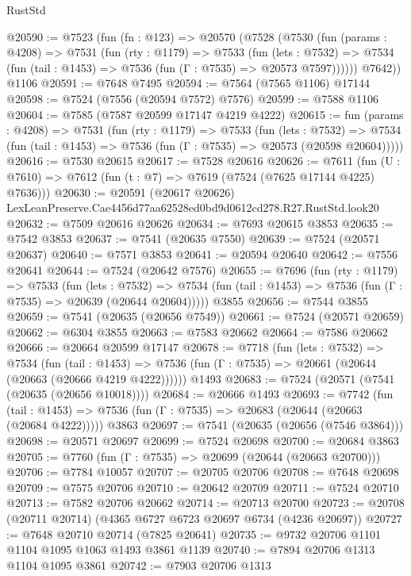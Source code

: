 \begin{lexlean}{RustStd}
\begin{coremodule}
@20590 := @7523
    (fun (fn : @123) =>
    @20570
      (@7528
        (@7530
          (fun (params : @4208) =>
          @7531
            (fun (rty : @1179) =>
            @7533
              (fun (lets : @7532) =>
              @7534 (fun (tail : @1453) => @7536 (fun (Γ : @7535) => @20573 @7597))))))
        @7642))
    @1106
@20591 := @7648 @7495
@20594 := @7564 (@7565 @1106) @17144
@20598 := @7524 (@7556 (@20594 @7572) @7576)
@20599 := @7588 @1106
@20604 := @7585 (@7587 @20599 @17147 @4219 @4222)
@20615 := fun (params : @4208) =>
  @7531
    (fun (rty : @1179) =>
    @7533
      (fun (lets : @7532) =>
      @7534 (fun (tail : @1453) => @7536 (fun (Γ : @7535) => @20573 (@20598 @20604)))))
@20616 := @7530 @20615
@20617 := @7528 @20616
@20626 := @7611
    (fun (U : @7610) => @7612 (fun (t : @7) => @7619 (@7524 (@7625 @17144 @4225) @7636)))
@20630 := @20591
    (@20617 @20626)
    LexLeanPreserve.Cae4456d77aa62528ed0bd9d0612cd278.R27.RustStd.look20
@20632 := @7509 @20616 @20626
@20634 := @7693 @20615 @3853
@20635 := @7542 @3853
@20637 := @7541 (@20635 @7550)
@20639 := @7524 (@20571 @20637)
@20640 := @7571 @3853
@20641 := @20594 @20640
@20642 := @7556 @20641
@20644 := @7524 (@20642 @7576)
@20655 := @7696
    (fun (rty : @1179) =>
    @7533
      (fun (lets : @7532) =>
      @7534 (fun (tail : @1453) => @7536 (fun (Γ : @7535) => @20639 (@20644 @20604)))))
    @3855
@20656 := @7544 @3855
@20659 := @7541 (@20635 (@20656 @7549))
@20661 := @7524 (@20571 @20659)
@20662 := @6304 @3855
@20663 := @7583 @20662
@20664 := @7586 @20662
@20666 := @20664 @20599 @17147
@20678 := @7718
    (fun (lets : @7532) =>
    @7534
      (fun (tail : @1453) =>
      @7536 (fun (Γ : @7535) => @20661 (@20644 (@20663 (@20666 @4219 @4222))))))
    @1493
@20683 := @7524 (@20571 (@7541 (@20635 (@20656 @10018))))
@20684 := @20666 @1493
@20693 := @7742
    (fun (tail : @1453) => @7536 (fun (Γ : @7535) => @20683 (@20644 (@20663 (@20684 @4222)))))
    @3863
@20697 := @7541 (@20635 (@20656 (@7546 @3864)))
@20698 := @20571 @20697
@20699 := @7524 @20698
@20700 := @20684 @3863
@20705 := @7760 (fun (Γ : @7535) => @20699 (@20644 (@20663 @20700)))
@20706 := @7784 @10057
@20707 := @20705 @20706
@20708 := @7648 @20698
@20709 := @7575 @20706
@20710 := @20642 @20709
@20711 := @7524 @20710
@20713 := @7582 @20706 @20662
@20714 := @20713 @20700
@20723 := @20708 (@20711 @20714) (@4365 @6727 @6723 @20697 @6734 (@4236 @20697))
@20727 := @7648 @20710 @20714 (@7825 @20641)
@20735 := @9732 @20706 @1101 @1104 @1095 @1063 @1493 @3861 @1139
@20740 := @7894 @20706 @1313 @1104 @1095 @3861
@20742 := @7903 @20706 @1313

\end{coremodule}
\end{lexlean}
